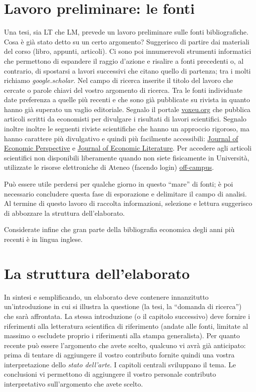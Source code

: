\documentclass[12pt]{article}
\begin{document}
\section{Lavoro preliminare: le fonti}\label{sec:fonti}
Una tesi, sia LT che LM, prevede un lavoro preliminare sulle fonti
bibliografiche. Cosa \`e gi\`a stato detto su un certo argomento?
Suggerisco di partire dai materiali del corso (libro, appunti,
articoli). Ci sono poi innumerevoli strumenti informatici che
permettono di espandere il raggio d'azione e risalire a fonti
precedenti o, al contrario, di spostarsi a lavori successivi che
citano quello di partenza; tra i molti richiamo
\textit{google.scholar}. Nel campo di ricerca inserite il titolo del
lavoro che cercate o parole chiavi del vostro argomento di
ricerca. Tra le fonti individuate date preferenza a quelle pi\`u
recenti e che sono gi\`a pubblicate su rivista in quanto hanno gi\`a
superato un vaglio editoriale. Segnalo il portale
\href{https://voxeu.org/}{voxeu.org} che pubblica articoli scritti da
economisti per divulgare i risultati di lavori scientifici. Segnalo
inoltre inoltre le seguenti riviste scientifiche che hanno un
approccio rigoroso, ma hanno carattere pi\`u divulgativo e quindi
pi\`u facilmente accessibili:
\href{https://www.aeaweb.org/journals/jep}{Journal of Economic
  Perspective} e \href{https://www.aeaweb.org/journals/jel}{Journal of
  Economic Literature}. Per accedere agli articoli scientifici non
disponibili liberamente quando non siete fisicamente in Universit\`a,
utilizzate le risorse elettroniche di Ateneo (facendo login)
\href{https://www.unicatt.it/off-campus}{off-campus}.

Pu\`o essere utile perdersi per qualche giorno in questo ``mare'' di
fonti; \`e poi necessario concludere questa fase di esporazione e
delimitare il campo di analisi. Al termine di questo lavoro di
raccolta informazioni, selezione e lettura suggerisco di abbozzare la
struttura dell'elaborato.

Considerate infine che gran parte della bibliografia economica degli
anni pi\`u recenti \`e in lingua inglese.



\section{La struttura dell'elaborato}
In sintesi e semplificando, un elaborato deve contenere innanzitutto
un'introduzione in cui si illustra la questione (la tesi, la ``domanda
di ricerca'') che sar\`a affrontata. La stessa introduzione (o il
capitolo successivo) deve fornire i riferimenti alla letteratura
scientifica di riferimento (andate alle fonti, limitate al massimo o
escludete proprio i riferimenti alla stampa generalista). Per quanto
recente pu\`o essere l'argomento che avete scelto, qualcuno vi avr\`a
gi\`a anticipato: prima di tentare di aggiungere il vostro contributo
fornite quindi una vostra interpretazione dello \textit{stato
  dell'arte}.  I capitoli centrali sviluppano il tema. Le conclusioni
vi permettono di aggiungere il vostro personale contributo
interpretativo sull'argomento che avete scelto.
\end{document}
